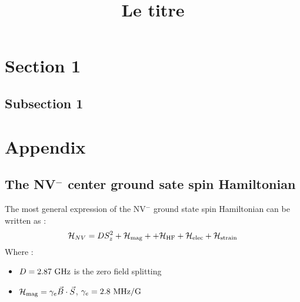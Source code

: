 \documentclass[a4paper]{article}
\title{Le titre}
\begin{document}
\maketitle
\section{Section 1}
\subsection{Subsection 1}

\section*{Appendix}
\subsection{The NV$^-$ center ground sate spin Hamiltonian}
The most general expression of the NV$^-$ ground state spin Hamiltonian can be written as :
\begin{equation}
\mathcal{H}_{NV}= D S_z^2 + \mathcal{H}_{\rm mag} + + \mathcal{H}_{\rm HF} + \mathcal{H}_{\rm elec} + \mathcal{H}_{\rm strain}
\end{equation}
Where : 
\begin{itemize}
\item $D=2.87\ \rm GHz$ is the zero field splitting
\item $\mathcal{H}_{\rm mag}= \gamma_e \vec{B} \cdot \vec{S}$, $\gamma_e=2.8\ \rm MHz/G$
\end{itemize}
\end{document}
